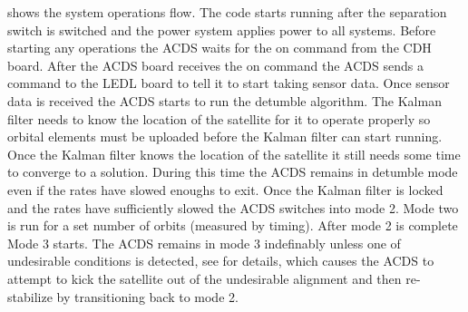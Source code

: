  shows the system operations flow. The code starts running after the separation switch is switched and the power system applies power to all systems. Before starting any operations the \ac{ACDS} waits for the on command from the \ac{CDH} board. After the \ac{ACDS} board receives the on command the \ac{ACDS} sends a command to the \ac{LEDL} board to tell it to start taking sensor data. Once sensor data is received the \ac{ACDS} starts to run the detumble algorithm. The Kalman filter needs to know the location of the satellite for it to operate properly so orbital elements must be uploaded before the Kalman filter can start running. Once the Kalman filter knows the location of the satellite it still needs some time to converge to a solution. During this time the \ac{ACDS} remains in detumble mode even if the rates have slowed enoughs to exit. Once the Kalman filter is locked and the rates have sufficiently slowed the \ac{ACDS} switches into mode 2. Mode two is run for a set number  of orbits (measured by timing). After mode 2 is complete Mode 3 starts. The \ac{ACDS} remains in mode 3 indefinably unless one of undesirable conditions is detected, see \cite{Mentch11} for details, which causes the \ac{ACDS} to attempt to kick the satellite out of the undesirable alignment and then re-stabilize by transitioning back to mode 2.


